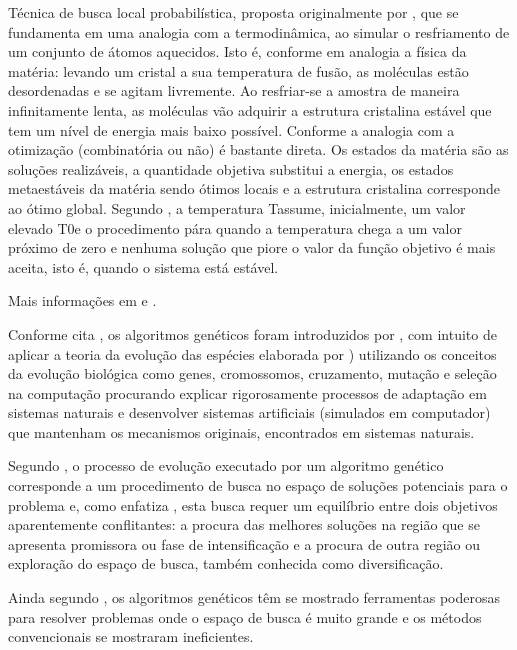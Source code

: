 

Técnica de busca local probabilística, proposta originalmente por \cite{Kirkpatrick et al. 
(1983)}, que se fundamenta em uma analogia com a termodinâmica, ao simular o 
resfriamento de um conjunto de átomos aquecidos. Isto é, conforme \cite{Noronha (2000)} em 
analogia a física da matéria: levando um cristal a sua temperatura de fusão, as moléculas 
estão desordenadas e se agitam livremente. Ao resfriar-se a amostra de maneira 
infinitamente lenta, as moléculas vão adquirir a estrutura cristalina estável que tem um 
nível de energia mais baixo possível. 
Conforme \cite{Aarts & Korst (1989)} a analogia com a otimização (combinatória ou não) 
é bastante direta. Os estados da matéria são as soluções realizáveis, a quantidade objetiva 
substitui a energia, os estados metaestáveis da matéria sendo ótimos locais e a estrutura 
cristalina corresponde ao ótimo global. 
Segundo \cite{Downsland (1993)}, a temperatura Tassume, inicialmente, um valor 
elevado T0e o procedimento pára quando a temperatura chega a um valor próximo de zero 
e nenhuma solução que piore o valor da função objetivo é mais aceita, isto é, quando o 
sistema está estável.\par
Mais informações em \cite{Downsland (1993)} e \cite{Kirkpatrick et al. (1983)}. 


Conforme cita \cite{Oliveira (2005)}, os algoritmos genéticos foram introduzidos 
por \cite{John Holland (Holland 1975)}, com intuito de aplicar a teoria da evolução das espécies 
elaborada por \cite{Darwin (Darwin 1859}) utilizando os conceitos da evolução biológica como 
genes, cromossomos, cruzamento, mutação e seleção na computação procurando explicar rigorosamente processos de adaptação em sistemas naturais e desenvolver sistemas artificiais (simulados em computador) que mantenham os mecanismos originais, encontrados em sistemas naturais.\par

Segundo \cite{Oliveira (2005)}, o processo de evolução executado por um algoritmo genético corresponde a um procedimento de busca no espaço de soluções potenciais para o problema e, como enfatiza \cite{Michalewicz (1992)}, esta busca requer um equilíbrio entre dois objetivos aparentemente conflitantes: a procura das melhores soluções na região que se apresenta promissora ou fase de intensificação e a procura de outra região ou exploração do espaço de busca, também conhecida como diversificação.\par
Ainda segundo \cite{Oliveira (2005)}, os algoritmos genéticos têm se mostrado ferramentas poderosas para resolver problemas onde o espaço de busca é muito grande e os métodos convencionais se mostraram ineficientes.\par

